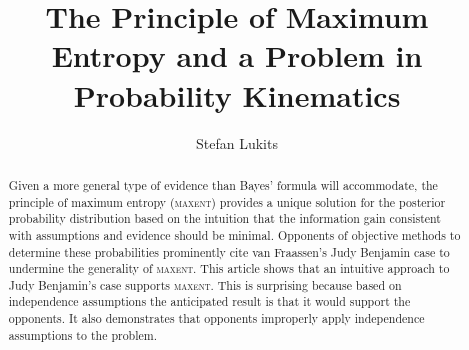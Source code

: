 \documentclass[11pt]{article}
\begin{document}

\title{The Principle of Maximum Entropy and a Problem in Probability Kinematics}

\author{Stefan Lukits}
\date{}

\maketitle



\begin{abstract}
  \noindent Given a more general type of evidence than Bayes' formula
  will accommodate, the principle of maximum entropy (\textsc{maxent})
  provides a unique solution for the posterior probability
  distribution based on the intuition that the information gain
  consistent with assumptions and evidence should be minimal.
  Opponents of objective methods to determine these probabilities
  prominently cite van Fraassen's Judy Benjamin case to undermine the
  generality of \textsc{maxent}. This article shows that an intuitive
  approach to Judy Benjamin's case supports \textsc{maxent}. This is
  surprising because based on independence assumptions the anticipated
  result is that it would support the opponents. It also demonstrates
  that opponents improperly apply independence assumptions to the
  problem.
\end{abstract}

\end{document}
